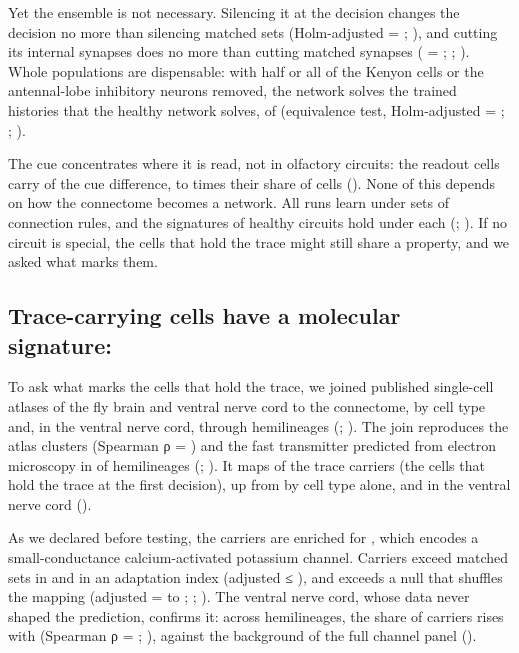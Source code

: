 Yet the ensemble is not necessary. Silencing it at the decision changes the decision no more than silencing matched sets
(Holm-adjusted \Pv{} = ; ), and cutting its internal synapses does no more than cutting matched synapses
(\Pv{} = ; ; ). Whole populations are dispensable: with half or all of the Kenyon cells or the
antennal-lobe inhibitory neurons removed, the network solves the trained histories that the healthy network solves, 
of  (equivalence test, Holm-adjusted \Pv{} = ; ; ).

The cue concentrates where it is read, not in olfactory circuits: the readout cells carry  of the cue difference,
 to  times their share of cells (). None of this depends on how the connectome becomes a network. All
 runs learn under  sets of connection rules, and the signatures of healthy circuits hold under each (;
). If no circuit is special, the cells that hold the trace might still share a property, and we asked what marks them.

\subsection{Trace-carrying cells have a molecular signature: }

To ask what marks the cells that hold the trace, we joined published single-cell atlases of the fly brain and ventral nerve
cord to the connectome, by cell type and, in the ventral nerve cord, through
 hemilineages (; ). The join reproduces the atlas clusters (Spearman ρ = ) and the
fast transmitter predicted from electron microscopy in  of  hemilineages (;
). It maps  of the trace carriers (the cells that hold the trace at the first decision), up from  by
cell type alone, and  in the ventral
nerve cord ().

As we declared before testing, the carriers are enriched for , which encodes a small-conductance calcium-activated
potassium channel. Carriers exceed matched sets in  and in an adaptation index (adjusted \Pv{} ≤ ), and
 exceeds a null that shuffles the mapping (adjusted \Pv{} =  to ; ; ). The ventral
nerve cord, whose data never shaped the prediction, confirms it: across  hemilineages, the share of carriers rises with
 (Spearman ρ = ; ), against the background of the full channel panel ().

